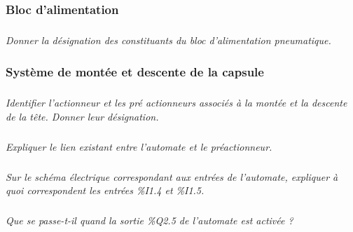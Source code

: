 \documentclass[10pt]{article}
\begin{document}
\newpage{}

\subsubsection*{Bloc d'alimentation}
\subparagraph{}
\textit{Donner la désignation des constituants du bloc d'alimentation pneumatique.}

\subsubsection*{Système de montée et descente de la capsule}
\subparagraph{}
\textit{Identifier l'actionneur et les pré actionneurs associés à la montée et la descente de la tête. Donner leur désignation.}

\subparagraph{}
\textit{Expliquer le lien existant entre l'automate et le préactionneur. }

\subparagraph{}
\textit{Sur le schéma électrique correspondant aux entrées de l'automate, expliquer à quoi correspondent les entrées \%I1.4 et \%I1.5.}


\subparagraph{}
\textit{Que se passe-t-il quand la sortie \%Q2.5 de l'automate est activée ?}
\end{document}
